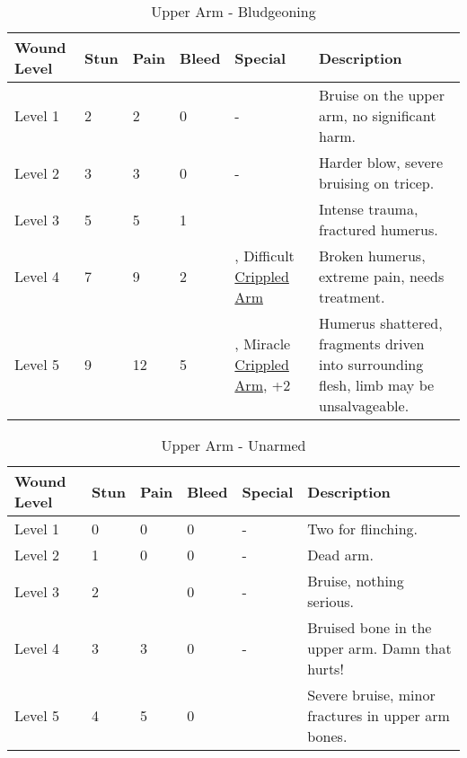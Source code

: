 \documentclass[oneside,11pt,english]{book}
\begin{document}
\begin{table}[hb] %
	\caption{Upper Arm - Bludgeoning}
	\label{wound:Upper Arm - Bludgeoning}
	\begin{tabu} to 
Wound Level &Stun &Pain &Bleed &Special &Description\\\toprule
Level 1& 2& 2& 0& - &Bruise on the upper arm, no significant harm.\\
Level 2& 3& 3& 0& - &Harder blow, severe bruising on tricep.\\
Level 3& 5& 5& 1&  &Intense trauma, fractured humerus.\\
Level 4& 7& 9& 2& , \newline
	Difficult~ \hyperref[bane:Crippled Limb/Appendage]{Crippled Arm} &Broken humerus, extreme pain, needs treatment.\\
Level 5& 9& 12& 5& , \newline
	Miracle~ \hyperref[bane:Crippled Limb/Appendage]{Crippled Arm}, \newline
	 +2 &Humerus shattered, fragments driven into surrounding flesh, limb may be unsalvageable.\\
	\end{tabu}
\end{table}

\begin{table}[!hb] %
	\caption{Upper Arm - Unarmed}
	\label{wound: Upper arm - Unarmed}
	\begin{tabu} to 
Wound Level &Stun &Pain &Bleed &Special &Description\\\toprule
Level 1 &0 &0 &0 &- &Two for flinching.\\
Level 2 &1 &0 &0 &- &Dead arm.\\
Level 3 &2 &  &0 &- &Bruise, nothing serious.\\ %
Level 4 &3 &3 &0 &- &Bruised bone in the upper arm. Damn that hurts!\\
Level 5 &4 &5 &0 & &Severe bruise, minor fractures in upper arm bones.\\
	\end{tabu}
\end{table}
	\clearpage
\end{document}
